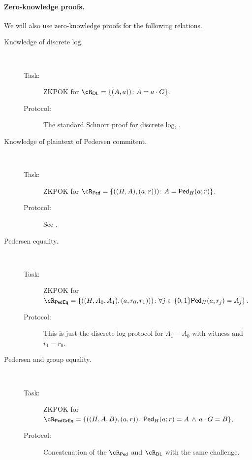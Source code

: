 \paragraph{Zero-knowledge proofs.}
We will also use zero-knowledge proofs  for the following relations.

\begin{description}
	\item[Knowledge of discrete log.] ~
	
	\begin{description}
		\item[Task:] ZKPOK for $\rdl = \rdlDef$.
		
		\item[Protocol:] The standard Schnorr proof for discrete log, \eg  \cite{Shoup00b}.
	\end{description}
	
	\item[Knowledge of plaintext of Pedersen commitent.] ~
	
		\begin{description}
		\item[Task:] ZKPOK for $\rPed = \rPedDef$.
	
	\item[Protocol:]  See \cite[Protocol A.1]{HaitnerLNR23}.
	\end{description}
	
		\item[Pedersen equality.] ~
	
	\begin{description}
		\item[Task:] ZKPOK for $\rPedEq = \rPedEqDef$.
		
		\item[Protocol:]  This is just the discrete log protocol for $A_1-A_0$ with witness and $r_1 - r_0$.
	\end{description}
	
	
		\item[Pedersen and group equality.] ~
	
	\begin{description}
		\item[Task:] ZKPOK for $\rPedGEq = \rPedGEqDef$.
		
		\item[Protocol:]  Concatenation of the $\rPed$ and $\rdl$ with the same challenge.
	\end{description}
	
\end{description}

